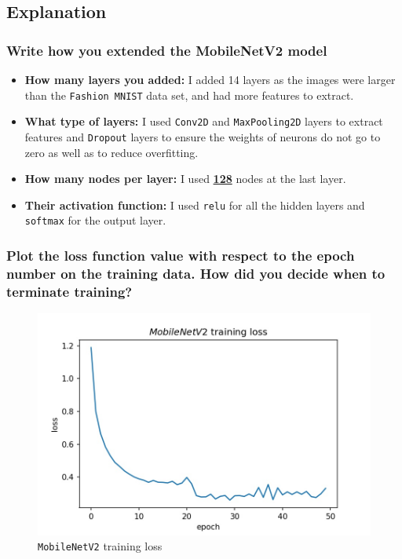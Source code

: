 \documentclass[12pt, letterpaper]{article}
\begin{document}
\subsection{Explanation}

\subsubsection{Write how you extended the MobileNetV2 model}
\begin{itemize}
\item \textbf{How many layers you added:} I added 14 layers as the images were larger than the \texttt{Fashion MNIST} data set, and had more features to extract.
\item \textbf{What type of layers:} I used \texttt{Conv2D} and \texttt{MaxPooling2D} layers to extract features and \texttt{Dropout} layers to ensure the weights of neurons do not go to zero as well as to reduce overfitting.
\item \textbf{How many nodes per layer:} I used \underline{\textbf{128}} nodes at the last layer.
\item \textbf{Their activation function:} I used \texttt{relu} for all the hidden layers and \texttt{softmax} for the output layer.
\end{itemize}
 
\subsubsection{Plot the loss function value with respect to the epoch number on the training data. How did you decide when to terminate training?}

\begin{figure}[h!]
\includegraphics[width=\linewidth]{history_loss.jpeg}
\caption{\texttt{MobileNetV2} training loss}
\label{fig:mobilenetv2-1}
\end{figure}
\end{document}
